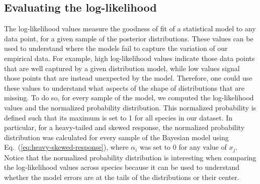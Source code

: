 \documentclass[11pt, a4paper]{article}
\begin{document}
\subsection*{Evaluating the log-likelihood}
The log-likelihood values measure the goodness of fit of a statistical model to any data point, for a given sample of the posterior distributions. These values can be used to understand where the models fail to capture the variation of our empirical data. For example, high log-likelihood values indicate those data points that are well captured by a given distribution model, while low values signal those points that are instead unexpected by the model. Therefore, one could use these values to understand what aspects of the shape of distributions that are missing. To do so, for every sample of the model, we computed the log-likelihood values and the normalized probability distribution. This normalized probability is defined such that its maximum is set to 1 for all species in our dataset. In particular, for a heavy-tailed and skewed response, the normalized probability distribution was calculated for every sample of the Bayesian model using Eq.~(\ref{eq:heavy-skewed-response}), where $\alpha_i$ was set to 0 for any value of $x_{j}$. Notice that the normalized probability distribution is interesting when comparing the log-likelihood values across species because it can be used to understand whether the model errors are at the tails of the distributions or their center. 
\end{document}
